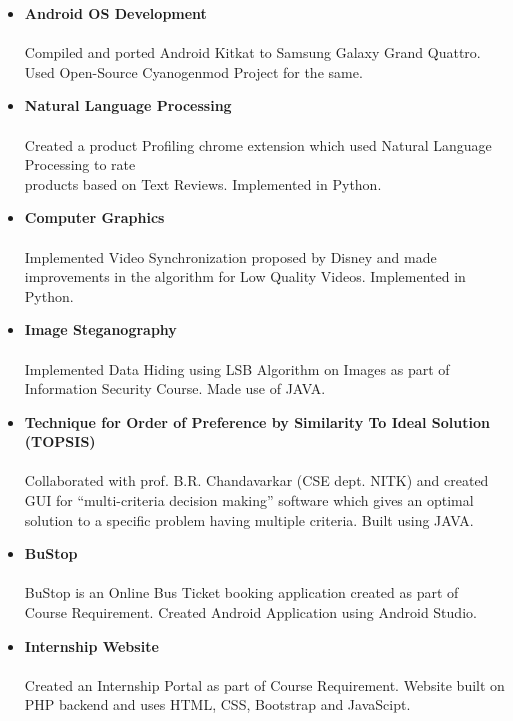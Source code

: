 \documentclass[10pt]{article} %
\begin{document}
\begin{itemize}
\item{\bf Android OS Development} \\
\\
Compiled and ported Android Kitkat to Samsung Galaxy Grand Quattro. Used Open-Source Cyanogenmod Project for the same. \\

\item{\bf Natural Language Processing} \\
\\
Created a product Profiling chrome extension which used Natural Language Processing to rate \\
products based on Text Reviews. Implemented in Python. \\

\item{\bf Computer Graphics} \\
\\
Implemented Video Synchronization proposed by Disney and made improvements in the algorithm for Low Quality Videos. Implemented in Python. \\

\item{\bf Image Steganography} \\
\\
Implemented Data Hiding using LSB Algorithm on Images as part of Information Security Course.
Made use of JAVA. \\

\item{\bf Technique for Order of Preference by Similarity To Ideal Solution (TOPSIS)} \\
\\
Collaborated with prof. B.R. Chandavarkar (CSE dept. NITK) and created GUI for “multi-criteria decision making” software which gives an optimal solution to a specific problem having multiple criteria. Built using JAVA. \\

\item{\bf BuStop} \\
\\
BuStop is an Online Bus Ticket booking application created as part of Course Requirement. Created Android Application using Android Studio. \\

\item{\bf Internship Website} \\
\\
Created an Internship Portal as part of Course Requirement. Website built on PHP backend and uses HTML, CSS, Bootstrap  and JavaScipt. \\
\\

\end{itemize}
\end{document}

